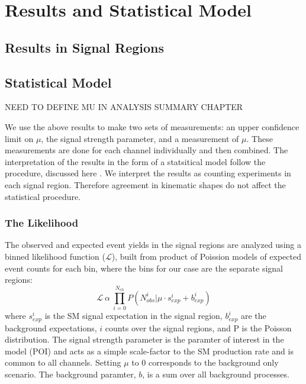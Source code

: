 \chapter[Results and Statistical Model][Results and Statsitical Model]{Results and Statistical Model} 
\label{chapter:results} 


\section{Results in Signal Regions}



\section{Statistical Model}
NEED TO DEFINE MU IN ANALYSIS SUMMARY CHAPTER


We use the above results to make two sets of measurements: an upper confidence limit on $\mu$, the signal strength parameter, and a measurement of $\mu$. These measurements are done for each channel individually and then combined. 
The interpretation of the results in the form of a statsitical model follow the procedure, discussed here \cite{asym}. We interpret the results as counting experiments in each signal region. Therefore agreement in kinematic shapes do not affect the statistical procedure. 




\subsection{The Likelihood} 
The observed and expected event yields in the signal regions are analyzed using a binned likelihood function ($\mathcal{L}$), built from product of Poission models of expected event counts for each bin, where the bins for our case are the separate signal regions:
\begin{equation}
\mathcal{L}\ \alpha\  \prod_{i=0}^{N_{ch}} P(N_{obs}^{i}| \mu \cdot s_{exp}^{i} + b_{exp}^{i})
\end{equation}
where $s_{exp}^i$ is the SM signal expectation in the signal region, $b_{exp}^i$ are the background expectations, $i$ counts over the signal regions, and P is the Poisson distribution. The signal strength parameter is the paramter of interest in the model (POI) and acts as a simple scale-factor to the SM \tth production rate and is common to all channels. Setting $\mu$ to 0 corresponds to the background only scenario. The background paramter, $b$, is a sum over all background processes. 

